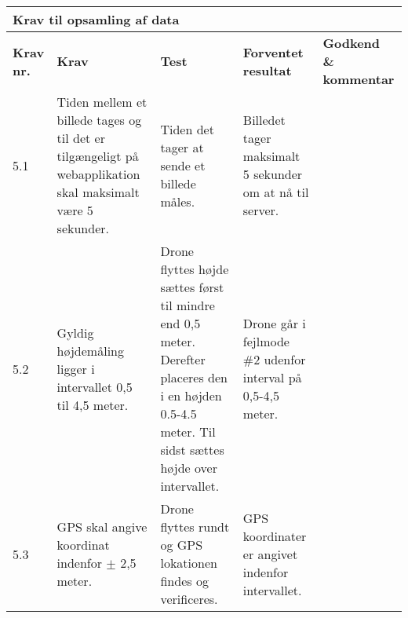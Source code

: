     \centering
    \begin{tabular}{|p{}|p{3.2 cm}|p{3.2 cm}|p{3.2 cm}|p{2.2 cm}|}
			\hline
			\multicolumn{5}{|l|}{\textbf{{\large Krav til opsamling af data}}}\\ \hline
			\textbf{Krav nr.} & \textbf{Krav} & \textbf{Test} & \textbf{Forventet \newline resultat} & 			
			\textbf{Godkend \& \newline kommentar} \\ \hline
			
			5.1 & Tiden mellem et billede tages og til det er tilgængeligt på webapplikation skal maksimalt være 5 sekunder.
				& Tiden det tager at sende et billede måles.
				& Billedet tager maksimalt 5 sekunder om at nå til server.
				& \\ \hline			
			
			5.2 & Gyldig højdemåling ligger i intervallet 0,5 til 4,5 meter.
				& Drone flyttes højde sættes først til mindre end 0,5 meter. Derefter placeres den i en højden 0.5-4.5 meter. Til sidst sættes højde over intervallet. 
				& Drone går i fejlmode \#2 udenfor interval på 0,5-4,5 meter.
				& \\ \hline

			5.3 & GPS skal angive koordinat indenfor $\pm$ 2,5 meter. 
				& Drone flyttes rundt og GPS lokationen findes og verificeres.
				& GPS koordinater er angivet indenfor intervallet. 
				&  \\ \hline		
		\end{tabular}
	\label{tab:krav_1}
